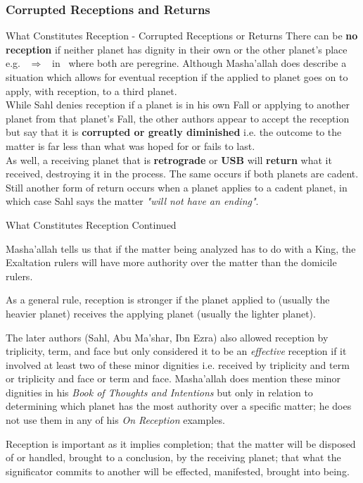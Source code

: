 \subsubsection{Corrupted Receptions and Returns}
\begin{frame}[t]{What Constitutes Reception - Corrupted Receptions or Returns}
There can be \textbf{no reception} if neither planet has dignity in their own or the other planet's place e.g. \Mercury\ $\Rightarrow$ \Jupiter\ in \Taurus\ where both are peregrine. Although Masha'allah does describe a situation which allows for eventual reception if the applied to planet goes on to apply, with reception, to a third planet.\\
\vspace{0.25cm}
While Sahl denies reception if a planet is in his own Fall or applying to another planet from that planet's Fall, the other authors appear to accept the reception but say that it is \textbf{corrupted or greatly diminished} i.e. the outcome to the matter is far less than what was hoped for or fails to last.\\
\vspace{0.25cm}
As well, a receiving planet that is \textbf{retrograde} or \textbf{USB} will \textbf{return} what it received, destroying it in the process. The same occurs if both planets are cadent.\footnotemark[1] \\
\vspace{0.25cm}
Still another form of return occurs when a planet applies to a cadent planet, in which case Sahl says the matter \textsl{"will not have an ending"}.

\end{frame}
\begin{frame}[t]{What Constitutes Reception Continued}

Masha'allah tells us that if the matter being analyzed has to do with a King, the Exaltation rulers will have more authority over the matter than the domicile rulers.

As a general rule, reception is stronger if the planet applied to (usually the heavier planet) receives the applying planet (usually the lighter planet).

The later authors (Sahl, Abu Ma'shar, Ibn Ezra) also allowed reception by triplicity, term, and face but only considered it to be an \textsl{effective} reception if it involved at least two of these minor dignities i.e. received by triplicity and term or triplicity and face or term and face. Masha'allah does mention these minor dignities in his \textsl{Book of Thoughts and Intentions} but only in relation to determining which planet has the most authority over a specific matter; he does not use them in any of his \textsl{On Reception} examples.
\begin{block}{}
Reception is important as it implies completion; that the matter will be disposed of or handled, brought to a conclusion, by the receiving planet; that what the significator commits to another will be effected, manifested, brought into being. 
\end{block}
\end{frame}